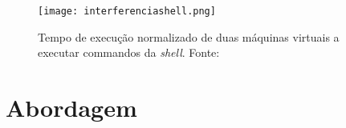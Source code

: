 \begin{figure}[t]
  \begin{center}
    \leavevmode
    \texttt{[image: interferenciashell.png]}
    \caption{Tempo de execução normalizado de duas máquinas virtuais a executar commandos da \textit{shell}. Fonte: \cite{koh2007analysis}}
    \label{fig:modeloshell}
  \end{center}
\end{figure}

\section{Abordagem}













